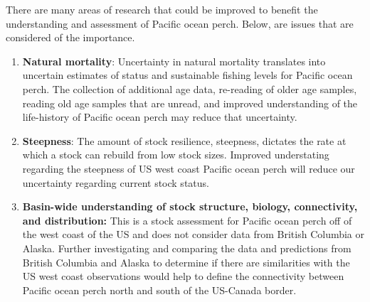 \documentclass[12pt,]{article}
\begin{document}
There are many areas of research that could be improved to benefit the
understanding and assessment of Pacific ocean perch. Below, are issues
that are considered of the importance.

\begin{enumerate}

\item \textbf{Natural mortality}: Uncertainty in natural mortality translates into uncertain estimates of status and sustainable fishing levels for Pacific ocean perch. The collection of additional age data, re-reading of older age samples, reading old age samples that are unread, and improved understanding of the life-history of Pacific ocean perch may reduce that uncertainty.

\item \textbf{Steepness}: The amount of stock resilience, steepness, dictates the rate at which a stock can rebuild from low stock sizes.  Improved understating regarding the steepness of US west coast Pacific ocean perch will reduce our uncertainty regarding current stock status.

\item \textbf{Basin-wide understanding of stock structure, biology, connectivity, and distribution:} This is a stock assessment for Pacific ocean perch off of the west coast of the US and does not consider data from British Columbia or Alaska. Further investigating and comparing the data and predictions from British Columbia and Alaska to determine if there are similarities with the US west coast observations would help to define the connectivity between Pacific ocean perch north and south of the US-Canada border.

\end{enumerate}
\end{document}
